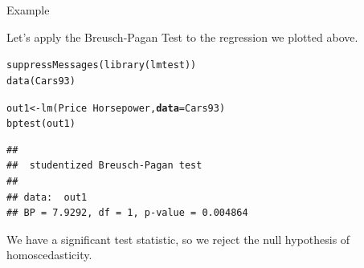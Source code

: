 \documentclass{beamer}\usepackage[]{graphicx}\usepackage[]{color}
\makeatletter
\newcommand{\hlopt}[1]{\textcolor[rgb]{0,0,0}{#1}}%
\newcommand{\hlstd}[1]{\textcolor[rgb]{0,0,0}{#1}}%
\newcommand{\hlkwb}[1]{\textcolor[rgb]{0,0.341,0.682}{#1}}%
\newcommand{\hlkwc}[1]{\textcolor[rgb]{0,0,0}{\textbf{#1}}}%
\newcommand{\hlkwd}[1]{\textcolor[rgb]{0.004,0.004,0.506}{#1}}%
\newenvironment{kframe}{%
 \def\at@end@of@kframe{}%
 \ifinner\ifhmode%
  \def\at@end@of@kframe{\end{minipage}}%
  \begin{minipage}{\columnwidth}%
 \fi\fi%
 \def\FrameCommand##1{\hskip\@totalleftmargin \hskip-\fboxsep
 \colorbox{shadecolor}{##1}\hskip-\fboxsep
     \hskip-\linewidth \hskip-\@totalleftmargin \hskip\columnwidth}%
 \MakeFramed {\advance\hsize-\width
   \@totalleftmargin\z@ \linewidth\hsize
   \@setminipage}}%
 {\par\unskip\endMakeFramed%
 \at@end@of@kframe}
\newenvironment{knitrout}{}{} %
\makeatother
\begin{document}
\watermarkoff %

\begin{frame}[fragile]{Example}
  
  Let's apply the Breusch-Pagan Test to the regression we plotted above.
  
\begin{knitrout}\footnotesize
{}\color{fgcolor}\begin{kframe}
\begin{alltt}
\hlkwd{suppressMessages}\hlstd{(}\hlkwd{library}\hlstd{(lmtest))}
\hlkwd{data}\hlstd{(Cars93)}

\hlstd{out1} \hlkwb{<-} \hlkwd{lm}\hlstd{(Price} \hlopt{~} \hlstd{Horsepower,} \hlkwc{data} \hlstd{= Cars93)}
\hlkwd{bptest}\hlstd{(out1)}
\end{alltt}
\begin{verbatim}
## 
## 	studentized Breusch-Pagan test
## 
## data:  out1
## BP = 7.9292, df = 1, p-value = 0.004864
\end{verbatim}
\end{kframe}
\end{knitrout}

We have a significant test statistic, so we reject the null hypothesis of 
homoscedasticity.

\end{frame}

\end{document}

